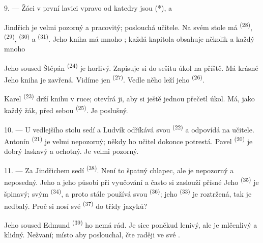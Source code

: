 \VUsaut{2.4mm}

\VUsaut{3.0mm}

9. --- Žáci v první lavici vpravo od katedry jsou  (*),
 a 

Jindřich je velmi pozorný a pracovitý; poslouchá učitele. Na svém stole má
 \textsuperscript{(28)},  \textsuperscript{(29)},
 \textsuperscript{(30)} a  \textsuperscript{(31)}. Jeho
kniha má mnoho ; každá kapitola obsahuje několik  a každý
 mnoho 

Jeho soused Štěpán \textsuperscript{(24)} je horlivý. Zapisuje si do sešitu úkol na příště. Má
krásné  Jeho kniha je zavřená. Vidíme jen 
\textsuperscript{(27)}. Vedle něho leží jeho  \textsuperscript{(26)}.

Karel \textsuperscript{(23)} drží knihu v ruce; otevírá ji, aby si ještě jednou přečetl úkol.
Má, jako každý žák, před sebou  \textsuperscript{(25)}. Je poslušný.

10. --- U vedlejšího stolu sedí  a  Ludvík odříkává
svou  \textsuperscript{(22)} a odpovídá na  učitele. Antonín
\textsuperscript{(21)} je velmi nepozorný; někdy ho učitel dokonce potrestá. Pavel
\textsuperscript{(20)} je dobrý  laskavý a ochotný. Je velmi pozorný.

\VUsaut{4.2mm}
\VUsaut{3.2mm}

11. --- Za Jindřichem sedí  \textsuperscript{(38)}. Není to špatný chlapec, ale
je  nepozorný a neposedný. Jeho  a jeho
 působí  při vyučování a často si zaslouží přísné
 Jeho  \textsuperscript{(35)} je špinavý;
 svým  \textsuperscript{(34)}, a proto
stále používá svou  \textsuperscript{(36)}; jeho 
\textsuperscript{(33)} je roztržená, tak je nedbalý. Proč si nosí své 
\textsuperscript{(37)} do třídy
 jazyků?

Jeho soused Edmund \textsuperscript{(39)} ho nemá rád. Je sice poněkud lenivý, ale je
mlčenlivý a klidný. Nežvaní; místo aby poslouchal, čte raději  ve své
.

